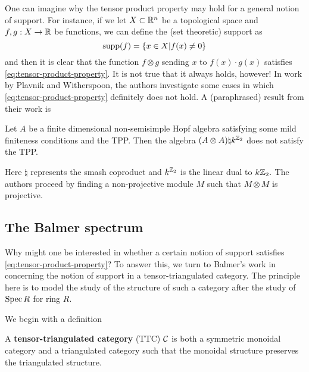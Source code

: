 \documentclass [11pt, proquest] {uwthesis}[2020/02/24]
\begin{document}
    One can imagine why the tensor product property may hold for a general notion of support. For instance, if we let $X\subset\mathbb{R}^n$ be a topological space and $f,g:X\to\mathbb{R}$ be functions, we can define the (set theoretic) support as 
    \[\operatorname{supp}(f)=\{x\in X|f(x)\ne 0\}\]
    and then it is clear that the function $f\otimes g$ sending $x$ to $f(x)\cdot g(x)$ satisfies \ref{eq:tensor-product-property}. It is not true that it always holds, however! In work by Plavnik and Witherspoon, the authors investigate some cases in which \ref{eq:tensor-product-property} definitely does not hold. A (paraphrased) result from their work is
    \begingroup
    \def\thethm{}
    \addtocounter{thm}{-1}
    \begin{thm}
        Let $A$ be a finite dimensional non-semisimple Hopf algebra satisfying some mild finiteness conditions and the TPP. Then the algebra $(A\otimes A)\natural k^{\mathbb{Z}_2}$ does not satisfy the TPP.
    \end{thm}
    \endgroup
    Here $\natural$ represents the smash coproduct and $k^{\mathbb{Z}_2}$ is the linear dual to $k\mathbb{Z}_2.$ The authors proceed by finding a non-projective module $M$ such that $M\otimes M$ is projective.
    
    \subsection{The Balmer spectrum}
    Why might one be interested in whether a certain notion of support satisfies \ref{eq:tensor-product-property}? To answer this, we turn to Balmer's work in \cite{balmer-spc} concerning the notion of support in a tensor-triangulated category. The principle here is to model the study of the structure of such a category after the study of $\operatorname{Spec} R$ for ring $R$.

    We begin with a definition
    \begin{defn}
    	A \textbf{tensor-triangulated category} (TTC) $\mathcal{C}$ is both a symmetric monoidal category and a triangulated category such that 
    	the monoidal structure preserves the triangulated structure. 
    \end{defn}
\end{document}
